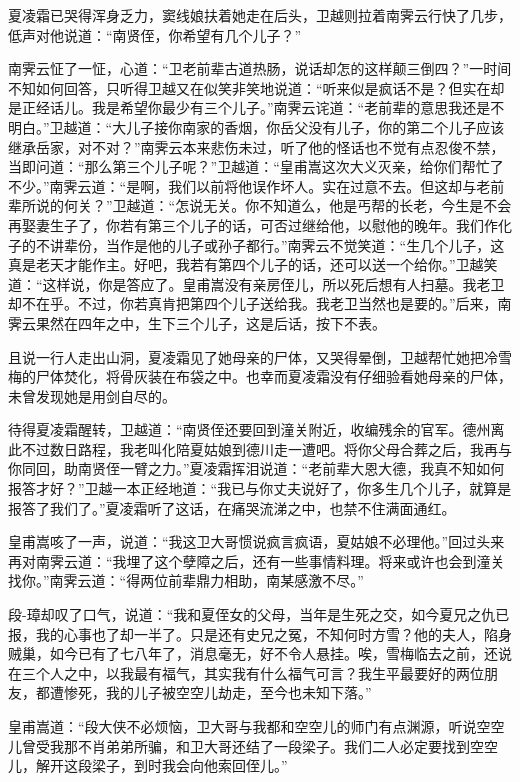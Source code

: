 \documentclass[12pt,oneside]{book}
\begin{document}
夏凌霜已哭得浑身乏力，窦线娘扶着她走在后头，卫越则拉着南霁云行快了几步，低声对他说道：``南贤侄，你希望有几个儿子？''

南霁云怔了一怔，心道：``卫老前辈古道热肠，说话却怎的这样颠三倒四？''一时间不知如何回答，只听得卫越又在似笑非笑地说道：``听来似是疯话不是？但实在却是正经话儿。我是希望你最少有三个儿子。''南霁云诧道：``老前辈的意思我还是不明白。''卫越道：``大儿子接你南家的香烟，你岳父没有儿子，你的第二个儿子应该继承岳家，对不对？''南霁云本来悲伤未过，听了他的怪话也不觉有点忍俊不禁，当即问道：``那么第三个儿子呢？''卫越道：``皇甫嵩这次大义灭亲，给你们帮忙了不少。''南霁云道：``是啊，我们以前将他误作坏人。实在过意不去。但这却与老前辈所说的何关？''卫越道：``怎说无关。你不知道么，他是丐帮的长老，今生是不会再娶妻生子了，你若有第三个儿子的话，可否过继给他，以慰他的晚年。我们作化子的不讲辈份，当作是他的儿子或孙子都行。''南霁云不觉笑道：``生几个儿子，这真是老天才能作主。好吧，我若有第四个儿子的话，还可以送一个给你。''卫越笑道：``这样说，你是答应了。皇甫嵩没有亲房侄儿，所以死后想有人扫墓。我老卫却不在乎。不过，你若真肯把第四个儿子送给我。我老卫当然也是要的。''后来，南霁云果然在四年之中，生下三个儿子，这是后话，按下不表。

且说一行人走出山洞，夏凌霜见了她母亲的尸体，又哭得晕倒，卫越帮忙她把冷雪梅的尸体焚化，将骨灰装在布袋之中。也幸而夏凌霜没有仔细验看她母亲的尸体，未曾发现她是用剑自尽的。

待得夏凌霜醒转，卫越道：``南贤侄还要回到潼关附近，收编残余的官军。德州离此不过数日路程，我老叫化陪夏姑娘到德川走一遭吧。将你父母合葬之后，我再与你同回，助南贤侄一臂之力。''夏凌霜挥泪说道：``老前辈大恩大德，我真不知如何报答才好？''卫越一本正经地道：``我已与你丈夫说好了，你多生几个儿子，就算是报答了我们了。''夏凌霜听了这话，在痛哭流涕之中，也禁不住满面通红。

皇甫嵩咳了一声，说道：``我这卫大哥惯说疯言疯语，夏姑娘不必理他。''回过头来再对南霁云道：``我埋了这个孽障之后，还有一些事情料理。将来或许也会到潼关找你。''南霁云道：``得两位前辈鼎力相助，南某感激不尽。''

段-璋却叹了口气，说道：``我和夏侄女的父母，当年是生死之交，如今夏兄之仇已报，我的心事也了却一半了。只是还有史兄之冤，不知何时方雪？他的夫人，陷身贼巢，如今已有了七八年了，消息毫无，好不令人悬挂。唉，雪梅临去之前，还说在三个人之中，以我最有福气，其实我有什么福气可言？我生平最要好的两位朋友，都遭惨死，我的儿子被空空儿劫走，至今也未知下落。''

皇甫嵩道：``段大侠不必烦恼，卫大哥与我都和空空儿的师门有点渊源，听说空空儿曾受我那不肖弟弟所骗，和卫大哥还结了一段梁子。我们二人必定要找到空空儿，解开这段梁子，到时我会向他索回侄儿。''
\end{document}
